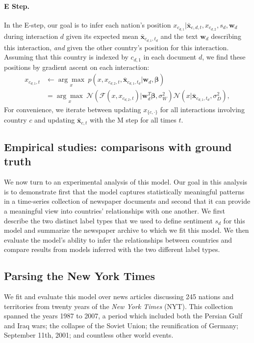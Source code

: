 \paragraph{E Step.} In the E-step, our goal is to infer each nation's
position $x_{c_{d,1}} | \bm \bar{x}_{c,d,t}, x_{c_{d,2}}, s_d, \bm
w_d$ during interaction $d$ given its expected mean $\bm \bar
x_{c_{d,1},t_d}$ and the text $\bm w_d$ describing this interaction,
\emph{and} given the other country's position for this interaction.
Assuming that this country is indexed by $c_{d,1}$ in each document $d$, we
find these positions by gradient ascent on each interaction:
\begin{align}
  x_{c_{d, 1}, t} & \gets \underset{ x }
  {\arg \max}\hspace{3pt}
  p(x, x_{c_{d,2},t}, \bm \bar x_{c_{d,1},t_d} | \bm w_d, \bm \beta) \nonumber \\
  & = \underset{x}
  { \arg \max }\hspace{3pt}
  \mathcal{N}( \mathcal{F}(x, x_{c_{d,2},t}) | \bm w_d^T \bm \beta,
  \sigma_W^2 )
  \mathcal{N}( x | \bm \bar x_{c_{d,1},t_d}, \sigma_D^2 ),
\end{align}
For convenience, we iterate between updating $x_{\{c,\cdot\}}$ for all
interactions involving country $c$ and updating $\bm \bar x_{c,t}$
with the M step for all times $t$.

\subsection{Empirical studies: comparisons with ground truth}
We now turn to an experimental analysis of this model.  Our goal in
this analysis is to demonstrate first that the model captures
statistically meaningful patterns in a time-series collection of
newspaper documents and second that it can provide a meaningful view
into countries' relationships with one another. We first describe the
two distinct label types that we used to define sentiment $s_d$ for
this model and summarize the newspaper archive to which we fit this
model.  We then evaluate the model's ability to infer the
relationships between countries and compare results from models
inferred with the two different label types.

\subsection{Parsing the New York Times}

We fit and evaluate this model over news articles discussing 245
nations and territories from twenty years of the \emph{New York Times}
(NYT).  This collection spanned the years 1987 to 2007, a period which
included both the Persian Gulf and Iraq wars; the collapse of the
Soviet Union; the reunification of Germany; September 11th, 2001; and
countless other world events.

